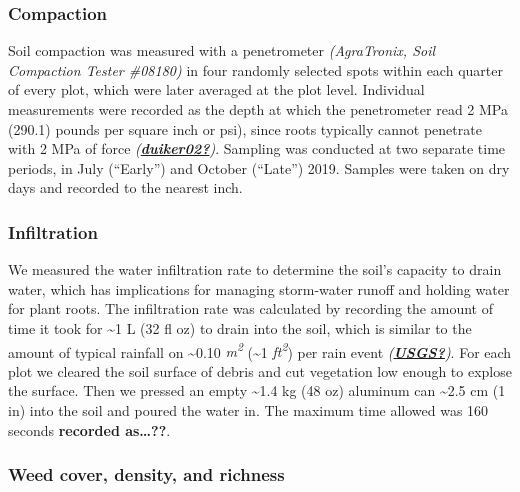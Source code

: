\documentclass[
]{article}
\begin{document}
\hypertarget{compaction}{%
\subsubsection{Compaction}\label{compaction}}

Soil compaction was measured with a penetrometer \emph{(AgraTronix, Soil Compaction Tester \#08180)} in four randomly selected spots within each quarter of every plot, which were later averaged at the plot level.
Individual measurements were recorded as the depth at which the penetrometer read 2 MPa (290.1) pounds per square inch or psi), since roots typically cannot penetrate with 2 MPa of force \emph{(\protect\hyperlink{ref-duiker02}{\textbf{duiker02?}})}.
Sampling was conducted at two separate time periods, in July (``Early'') and October (``Late'') 2019.
Samples were taken on dry days and recorded to the nearest inch.

\hypertarget{infiltration}{%
\subsubsection{Infiltration}\label{infiltration}}

We measured the water infiltration rate to determine the soil's capacity to drain water, which has implications for managing storm-water runoff and holding water for plant roots.
The infiltration rate was calculated by recording the amount of time it took for \textasciitilde1 L (32 fl oz) to drain into the soil, which is similar to the amount of typical rainfall on \textasciitilde0.10 \emph{m\textsuperscript{2}} (\textasciitilde1 \emph{ft\textsuperscript{2}}) per rain event \emph{(\protect\hyperlink{ref-USGS}{\textbf{USGS?}})}.
For each plot we cleared the soil surface of debris and cut vegetation low enough to explose the surface.
Then we pressed an empty \textasciitilde1.4 kg (48 oz) aluminum can \textasciitilde2.5 cm (1 in) into the soil and poured the water in.
The maximum time allowed was 160 seconds \textbf{recorded as\ldots??}.

\hypertarget{weed-cover-density-and-richness}{%
\subsubsection{Weed cover, density, and richness}\label{weed-cover-density-and-richness}}
\end{document}
